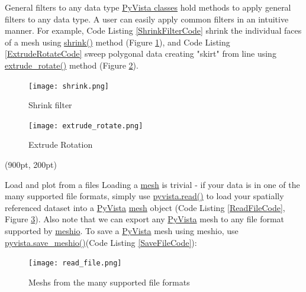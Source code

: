 \documentclass[final]{beamer}
\begin{document}
\begin{frame}[fragile]
\begin{textblock*}{800pt}
\begin{block}{General filters to any data type}
\href{https://dev.pyvista.org/core/filters.html}{PyVista classes} hold methods to apply general filters to any data type.
A user can easily apply common filters in an intuitive manner.
For example,
Code Listing \ref{ShrinkFilterCode} shrink the individual faces of a mesh
using \href{https://dev.pyvista.org/core/filters.html#pyvista.DataSetFilters.shrink}{shrink()} method (Figure \ref{ShrinkFilterFigure}), and
Code Listing \ref{ExtrudeRotateCode} sweep polygonal data creating "skirt" from line
using \href{https://dev.pyvista.org/core/filters.html#pyvista.PolyDataFilters.extrude_rotate}{extrude\_rotate()} method (Figure \ref{ExtrudeRotateFigure}).

\begin{figure}
\texttt{[image: shrink.png]}
\caption{Shrink filter\label{ShrinkFilterFigure}}
\end{figure}

\begin{figure}
\texttt{[image: extrude\_rotate.png]}
\caption{Extrude Rotation\label{ExtrudeRotateFigure}}
\end{figure}
\end{block}
\end{textblock*}

\begin{textblock*}{800pt}(900pt, 200pt)
\begin{block}{Load and plot from a files}
Loading a \href{https://dev.pyvista.org/getting-started/what-is-a-mesh.html}{mesh} is trivial - if your data is in one of the many supported file formats,
simply use \href{https://dev.pyvista.org/utilities/utilities.html#pyvista.read}{pyvista.read()}
to load your spatially referenced dataset into a \href{https://pypi.org/project/pyvista/}{PyVista} \href{https://dev.pyvista.org/getting-started/what-is-a-mesh.html}{mesh} object
(Code Listing \ref{ReadFileCode}, Figure \ref{ReadFileFigure}).
Also note that we can export any \href{https://pypi.org/project/pyvista/}{PyVista} mesh to any file format supported by \href{https://pypi.org/project/meshio/}{meshio}.
To save a \href{https://pypi.org/project/pyvista/}{PyVista} mesh using meshio, use \href{https://dev.pyvista.org/utilities/utilities.html#pyvista.save_meshio}{pyvista.save\_meshio()}(Code Listing \ref{SaveFileCode}):

\begin{figure}
\texttt{[image: read\_file.png]}
\caption{Meshs from the many supported file formats\label{ReadFileFigure}}
\end{figure}

\end{block}
\end{textblock*}


\end{frame}
\end{document}

